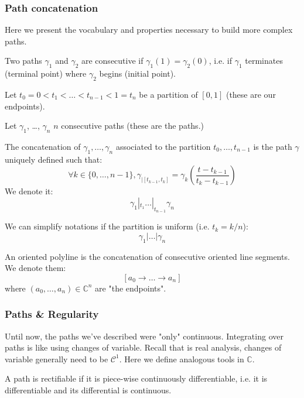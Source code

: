 \subsubsection{Path concatenation}

Here we present the vocabulary and properties necessary to build more complex paths.
\begin{defi}
    Two paths $\gamma_1$ and $\gamma_2$ are consecutive if $\gamma_1(1) = \gamma_2(0)$, i.e. if $\gamma_1$ terminates (terminal point) where $\gamma_2$ begins (initial point).
\end{defi}

\begin{defi}
    Let $t_0=0 < t_1 < \dots < t_{n-1} < 1=t_n $ be a partition of $[0,1]$ (these are our endpoints).

    Let $\gamma_1$, \dots, $\gamma_n$ $n$ consecutive paths (these are the paths.)

    The concatenation of $\gamma_1, \dots, \gamma_n$ associated to the partition $t_0, \dots, t_{n-1}$ is the path $\gamma$ uniquely defined such that:
    $$ \boxed{\forall k \in \lbrace0, \dots, n-1\rbrace, \gamma_{|[t_{k-1}, t_{k}]}= \gamma_k\left( \frac{t-t_{k-1}}{t_k - t_{k-1}} \right)}$$
    We denote it:
    $$ \gamma_1 |_{t_1} \dots |_{t_{n-1}} \gamma_n$$
\end{defi}

We can simplify notations if the partition is uniform (i.e. $t_k = k/n$):
    $$ \gamma_1 | \dots | \gamma_n$$

\begin{example}
    An oriented polyline is the concatenation of consecutive oriented line segments. We denote them:
    $$[a_0 \rightarrow \dots \rightarrow a_n]$$
    where $(a_0, \dots, a_n)\in\mathbb{C}^n$ are "the endpoints".
\end{example}

\subsubsection{Paths \& Regularity}

Until now, the paths we've described were "only" continuous. Integrating over paths is like using changes of variable. Recall that is real analysis, changes of variable generally need to be $\mathcal{C}^1$. Here we define analogous tools in $\mathbb{C}$.

\begin{defi}
    A path is rectifiable if it is piece-wise continuously differentiable, i.e. it is differentiable and its differential is continuous.
\end{defi}

